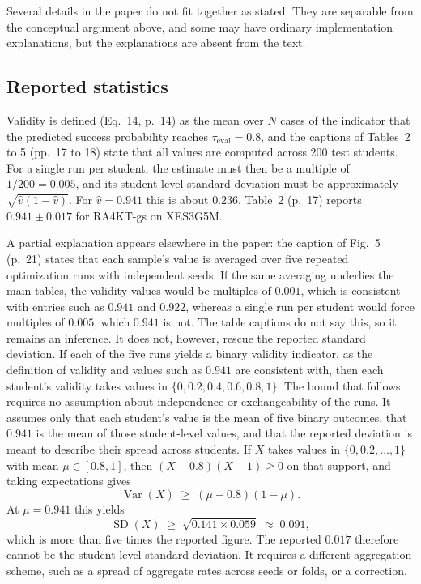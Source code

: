 \documentclass[11pt]{article}
\begin{document}
Several details in the paper do not fit together as stated. They are separable from the conceptual argument above, and some may have ordinary implementation explanations, but the explanations are absent from the text.

\subsection{Reported statistics}

Validity is defined (Eq.~14, p.~14) as the mean over $N$ cases of the indicator that the predicted success probability reaches $\tau_{\mathrm{eval}}=0.8$, and the captions of Tables~2 to 5 (pp.~17 to 18) state that all values are computed across 200 test students. For a single run per student, the estimate must then be a multiple of $1/200=0.005$, and its student-level standard deviation must be approximately $\sqrt{\hat v(1-\hat v)}$. For $\hat v=0.941$ this is about $0.236$. Table~2 (p.~17) reports $0.941\pm0.017$ for RA4KT-gs on XES3G5M.

A partial explanation appears elsewhere in the paper: the caption of Fig.~5 (p.~21) states that each sample's value is averaged over five repeated optimization runs with independent seeds. If the same averaging underlies the main tables, the validity values would be multiples of $0.001$, which is consistent with entries such as $0.941$ and $0.922$, whereas a single run per student would force multiples of $0.005$, which $0.941$ is not. The table captions do not say this, so it remains an inference. It does not, however, rescue the reported standard deviation. If each of the five runs yields a binary validity indicator, as the definition of validity and values such as $0.941$ are consistent with, then each student's validity takes values in $\{0,0.2,0.4,0.6,0.8,1\}$. The bound that follows requires no assumption about independence or exchangeability of the runs. It assumes only that each student's value is the mean of five binary outcomes, that $0.941$ is the mean of those student-level values, and that the reported deviation is meant to describe their spread across students. If $X$ takes values in $\{0,0.2,\dots,1\}$ with mean $\mu\in[0.8,1]$, then $(X-0.8)(X-1)\ge0$ on that support, and taking expectations gives
\[
\operatorname{Var}(X)\;\ge\;(\mu-0.8)(1-\mu).
\]
At $\mu=0.941$ this yields
\[
\operatorname{SD}(X)\;\ge\;\sqrt{0.141\times0.059}\;\approx\;0.091,
\]
which is more than five times the reported figure. The reported $0.017$ therefore cannot be the student-level standard deviation. It requires a different aggregation scheme, such as a spread of aggregate rates across seeds or folds, or a correction.
\end{document}
